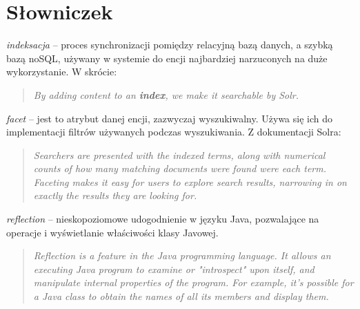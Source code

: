 \section{Słowniczek}
\noindent
\textit{indeksacja} -- proces synchronizacji pomiędzy relacyjną bazą danych, a szybką bazą noSQL, używany w systemie do encji najbardziej narzuconych na duże wykorzystanie. W skrócie: 
\begin{quote}
	\textit{By adding content to an \textbf{index}, we make it searchable by Solr.}\cite{Solr} 
\end{quote}

\noindent
\textit{facet} -- jest to atrybut danej encji, zazwyczaj wyszukiwalny. Używa się ich do implementacji filtrów używanych podczas wyszukiwania. Z dokumentacji Solra:
\begin{quote} \textit{
	Searchers are presented with the indexed terms, along with numerical counts of how many matching documents were found were each term. Faceting makes it easy for users to explore search results, narrowing in on exactly the results they are looking for.
	}\cite{Solr}
\end{quote}

\noindent
\textit{reflection} -- nieskopoziomowe udogodnienie w języku Java, pozwalające na operacje i wyświetlanie właściwości klasy Javowej.
\begin{quote} \textit{
		Reflection is a feature in the Java programming language. It allows an executing Java program to examine or "introspect" upon itself, and manipulate internal properties of the program. For example, it's possible for a Java class to obtain the names of all its members and display them.
	}\cite{oracle}
\end{quote}




